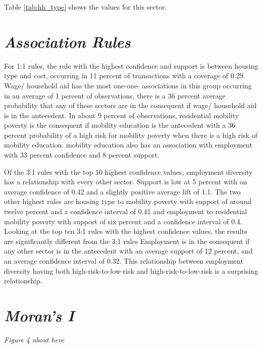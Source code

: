 Table \ref{tab:hh_type} shows the values for this sector. 






\section{\textit{Association Rules}}
For 1:1 rules, the rule with the highest confidence and support is between housing type and cost, occurring in 11 percent of transactions with a coverage of 0.29. Wage/ household aid has the most one-one- associations in this group occurring in an average of 1 percent of observations, there is a 36 percent average probability that any of these sectors are in the consequent if wage/ household aid is in the antecedent. In about 9 percent of observations, residential mobility poverty is the consequent if mobility education is the antecedent with a 36 percent probability of a high risk for mobility poverty when there is a high risk of mobility education. mobility education also has an association with employment with 33 percent confidence and 8 percent support. 

Of the 3:1 rules with the top 10 highest confidence values, employment diversity has a relationship with every other sector. Support is low at 5 percent with an average confidence of 0.42 and a slightly positive average lift of 1.1. The two other highest rules are housing type to mobility poverty with support of around twelve percent and a confidence interval of 0.41 and employment to residential mobility poverty with support of six percent and a confidence interval of 0.4. Looking at the top ten 3:1 rules with the highest confidence values, the results are significantly different from the 3:1 rules Employment is in the consequent if any other sector is in the antecedent with an average support of 12 percent, and an average confidence interval of 0.32. This relationship between employment diversity having both high-risk-to-low-risk and high-risk-to-low-risk is a surprising relationship. 

\section{\textit{Moran's I}}

\textit{Figure 4 about here}

